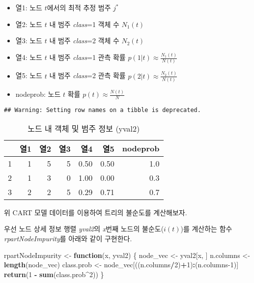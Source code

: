 \documentclass[]{book}
\newenvironment{Shaded}{\begin{snugshade}}{\end{snugshade}}
\newcommand{\ControlFlowTok}[1]{\textcolor[rgb]{0.13,0.29,0.53}{\textbf{#1}}}
\newcommand{\DecValTok}[1]{\textcolor[rgb]{0.00,0.00,0.81}{#1}}
\newcommand{\KeywordTok}[1]{\textcolor[rgb]{0.13,0.29,0.53}{\textbf{#1}}}
\newcommand{\NormalTok}[1]{#1}
\newcommand{\OperatorTok}[1]{\textcolor[rgb]{0.81,0.36,0.00}{\textbf{#1}}}
\newcommand{\StringTok}[1]{\textcolor[rgb]{0.31,0.60,0.02}{#1}}
\providecommand{\tightlist}{%
  \setlength{\itemsep}{0pt}\setlength{\parskip}{0pt}}
\begin{document}
\begin{itemize}
\tightlist
\item
  열1: 노드 \(t\)에서의 최적 추정 범주 \(j^*\)
\item
  열2: 노드 \(t\) 내 범주 \emph{class}=1 객체 수 \(N_1(t)\)
\item
  열3: 노드 \(t\) 내 범주 \emph{class}=2 객체 수 \(N_2(t)\)
\item
  열4: 노드 \(t\) 내 범주 \emph{class}=1 관측 확률 \(p(1|t) \approx \tfrac{N_1(t)}{N(t)}\)
\item
  열5: 노드 \(t\) 내 범주 \emph{class}=2 관측 확률 \(p(2|t) \approx \tfrac{N_2(t)}{N(t)}\)
\item
  nodeprob: 노드 \(t\) 확률 \(p(t) \approx \tfrac{N(t)}{N}\)
\end{itemize}

\begin{verbatim}
## Warning: Setting row names on a tibble is deprecated.
\end{verbatim}

\begin{table}[t]

\caption{\label{tab:firstsplit-yval2}노드 내 객체 및 범주 정보 (yval2)}
\centering
\begin{tabular}{lrrrrrr}
\toprule
  & 열1 & 열2 & 열3 & 열4 & 열5 & nodeprob\\
\midrule
1 & 1 & 5 & 5 & 0.50 & 0.50 & 1.0\\
2 & 1 & 3 & 0 & 1.00 & 0.00 & 0.3\\
3 & 2 & 2 & 5 & 0.29 & 0.71 & 0.7\\
\bottomrule
\end{tabular}
\end{table}

위 CART 모델 데이터를 이용하여 트리의 불순도를 계산해보자.

우선 노드 상세 정보 행렬 \emph{yval2}의 \emph{x}번째 노드의 불순도(\(i(t)\))를 계산하는 함수 \emph{rpartNodeImpurity}를 아래와 같이 구현한다.

\begin{Shaded}
\begin{Highlighting}[]
\NormalTok{rpartNodeImpurity <-}\StringTok{ }\ControlFlowTok{function}\NormalTok{(x, yval2) \{}
\NormalTok{  node_vec <-}\StringTok{ }\NormalTok{yval2[x, ]}
\NormalTok{  n.columns <-}\StringTok{ }\KeywordTok{length}\NormalTok{(node_vec)}
\NormalTok{  class.prob <-}\StringTok{ }\NormalTok{node_vec[((n.columns}\OperatorTok{/}\DecValTok{2}\NormalTok{)}\OperatorTok{+}\DecValTok{1}\NormalTok{)}\OperatorTok{:}\NormalTok{(n.columns}\DecValTok{-1}\NormalTok{)]}
  \KeywordTok{return}\NormalTok{(}\DecValTok{1} \OperatorTok{-}\StringTok{ }\KeywordTok{sum}\NormalTok{(class.prob}\OperatorTok{^}\DecValTok{2}\NormalTok{))}
\NormalTok{\}}
\end{Highlighting}
\end{Shaded}
\end{document}

